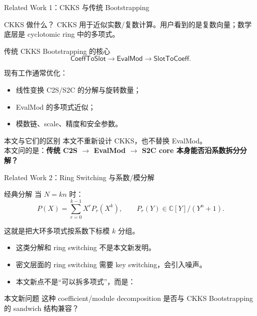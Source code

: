 \documentclass[aspectratio=169, 10pt, xcolor=svgnames, table, UTF8]{ctexbeamer}
\begin{document}
\begin{frame}{Related Work 1：CKKS 与传统 Bootstrapping}
  \begin{block}{CKKS 做什么？}
    CKKS 用于近似实数/复数计算。用户看到的是复数向量；数学底层是 cyclotomic ring 中的多项式。
  \end{block}
  
  \pause
  \begin{block}{传统 CKKS Bootstrapping 的核心}
    \[
    \mathsf{CoeffToSlot}
    \to
    \mathsf{EvalMod}
    \to
    \mathsf{SlotToCoeff}.
    \]
    
    现有工作通常优化：
    \begin{itemize}
      \item 线性变换 C2S/S2C 的分解与旋转数量；
      \item EvalMod 的多项式近似；
      \item 模数链、scale、精度和安全参数。
    \end{itemize}
  \end{block}
  
  \pause
  \begin{alertblock}{本文与它们的区别}
    本文不重新设计 CKKS，也不替换 EvalMod。\\
    本文问的是：\textbf{传统 C2S \(\to\) EvalMod \(\to\) S2C core 本身能否沿系数拆分分解？}
  \end{alertblock}
\end{frame}

\begin{frame}{Related Work 2：Ring Switching 与系数/模分解}
  \begin{block}{经典分解}
    当 \(N=kn\) 时：
    \[
    P(X)=\sum_{r=0}^{k-1} X^r P_r(X^k),
    \qquad P_r(Y)\in \mathbb{C}[Y]/(Y^n+1).
    \]
    
    这就是把大环多项式按系数下标模 \(k\) 分组。
  \end{block}
  
  \pause
  \begin{itemize}
    \item 这类分解和 ring switching 不是本文新发明。
    \item 密文层面的 ring switching 需要 key switching，会引入噪声。
    \item 本文新点不是“可以拆多项式”，而是：
  \end{itemize}
  
  \begin{exampleblock}{本文新问题}
    这种 coefficient/module decomposition 是否与 CKKS Bootstrapping 的 sandwich 结构兼容？
  \end{exampleblock}
\end{frame}
\end{document}
